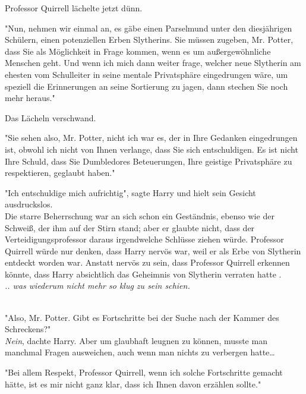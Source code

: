 {Professor Quirrell lächelte jetzt dünn.

"Nun, nehmen wir einmal an, es gäbe einen Parselmund unter den diesjährigen Schülern, einen potenziellen Erben Slytherins. Sie müssen zugeben, Mr. Potter, dass Sie als Möglichkeit in Frage kommen, wenn es um außergewöhnliche Menschen geht. Und wenn ich mich dann weiter frage, welcher neue Slytherin am ehesten vom Schulleiter in seine mentale Privatsphäre eingedrungen wäre, um speziell die Erinnerungen an seine Sortierung zu jagen, dann stechen Sie noch mehr heraus."

Das Lächeln verschwand.

"Sie sehen also, Mr. Potter, nicht ich war es, der in Ihre Gedanken eingedrungen ist, obwohl ich nicht von Ihnen verlange, dass Sie sich entschuldigen. Es ist nicht Ihre Schuld, dass Sie Dumbledores Beteuerungen, Ihre geistige Privatsphäre zu respektieren, geglaubt haben."

"Ich entschuldige mich aufrichtig", sagte Harry und hielt sein Gesicht ausdruckslos.\\ Die starre Beherrschung war an sich schon ein Geständnis, ebenso wie der Schweiß, der ihm auf der Stirn stand; aber er glaubte nicht, dass der Verteidigungsprofessor daraus irgendwelche Schlüsse ziehen würde. Professor Quirrell würde nur denken, dass Harry nervös war, weil er als Erbe von Slytherin entdeckt worden war. Anstatt nervös zu sein, dass Professor Quirrell erkennen könnte, dass Harry absichtlich das Geheimnis von Slytherin verraten hatte .\\ \emph{.. was wiederum nicht mehr so klug zu sein schien.\\ }\strut \\ "Also, Mr. Potter. Gibt es Fortschritte bei der Suche nach der Kammer des Schreckens?"\\ \emph{Nein}, dachte Harry. Aber um glaubhaft leugnen zu können, musste man manchmal Fragen ausweichen, auch wenn man nichts zu verbergen hatte…

"Bei allem Respekt, Professor Quirrell, wenn ich solche Fortschritte gemacht hätte, ist es mir nicht ganz klar, dass ich Ihnen davon erzählen sollte."

}
